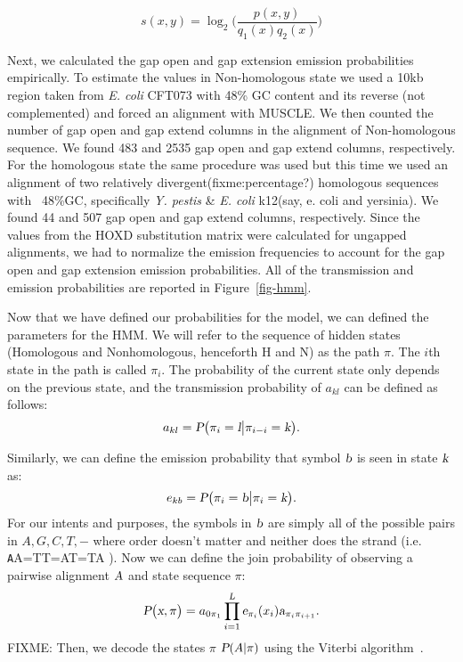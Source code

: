 \documentclass{ws-procs9x6}
\begin{document}
\begin{equation}
s(x,y)= \log_{2}{\Bigg(\frac{p(x,y)}{q_{1}(x)q_{2}(x)}\Bigg)}
\end{equation}

Next, we calculated the gap open and gap extension emission probabilities empirically. To estimate the values in Non-homologous state we used a 10kb region taken from \emph{E. coli} CFT073 with 48\% GC content and its reverse (not complemented) and forced an alignment with MUSCLE.  We then counted the number of gap open and gap extend columns in the alignment of Non-homologous sequence. We found 483 and 2535 gap open and  gap extend columns, respectively.  For the homologous state the same procedure was used but this time we used an alignment of two relatively divergent(fixme:percentage?) homologous sequences with ~48\%GC, specifically \emph{Y. pestis} \& \emph{E. coli} k12(say, e. coli and yersinia). We found 44 and 507 gap open and  gap extend columns, respectively.  Since the values from the HOXD substitution matrix were calculated for ungapped alignments, we had to normalize the emission frequencies to account for the gap open and gap extension emission probabilities. All of the transmission and emission probabilities are reported in Figure~\ref{fig-hmm}.

Now that we have defined our probabilities for the model, we can defined the parameters for the HMM. We will refer to the sequence of hidden states (Homologous and Nonhomologous, henceforth H and N) as the path $\pi$. The $i$th state in the path is called $\pi_{i}$. The probability of the current state only depends on the previous state, and the transmission probability of $a_{kl}$ can be defined as follows:
\begin{equation}
a_{kl} = \textsl{P}\big(\pi_{i}=\textsl{l}\big|\pi_{i-i}=\textsl{k}\big).
\end{equation}

Similarly, we can define the emission probability that symbol $\textsl{b}$ is seen in state $\textsl{k}$ as:
\begin{equation}
e_{kb} = \textsl{P}\big(\pi_{i}=\textsl{b}\big|\pi_{i}=\textsl{k}\big).
\end{equation}
For our intents and purposes, the symbols in $\textsl{b}$ are simply all of the possible pairs in ${A,G,C,T,-}$ where order doesn't matter and neither does the strand (i.e. {\texttt AA=TT=AT=TA} ). Now we can define the join probability of observing a pairwise alignment $\textsl{A}$ and state sequence $\pi$:
\begin{equation}
\textsl{P}\big(\textsl{x},\pi\big) = a_{0\pi_{1}}\prod_{i=1}^\textsl{L}\textsl{e}_{\pi_{i}}(x_{i})\textsl{a}_{\pi_{i}\pi_{i+1}}.
\end{equation}
FIXME: Then, we decode the states $\pi$ $\textsl{P}(A |\pi)$ using the Viterbi algorithm~\cite{durbin}.
\end{document}
